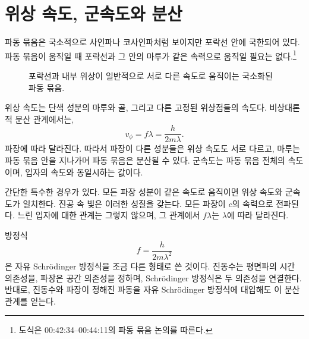 \section{위상 속도, 군속도와 분산}

\begin{classroomqa}\end{classroomqa}

파동 묶음은 국소적으로 사인파나 코사인파처럼 보이지만 포락선 안에 국한되어 있다. 파동 묶음이 움직일 때 포락선과 그 안의 마루가 같은 속력으로 움직일 필요는 없다.\footnote{도식은 00:42:34--00:44:11의 파동 묶음 논의를 따른다.}

\begin{figure}[t]\centering
{}\caption{포락선과 내부 위상이 일반적으로 서로 다른 속도로 움직이는 국소화된 파동 묶음.}\end{figure}

위상 속도는 단색 성분의 마루와 골, 그리고 다른 고정된 위상점들의 속도다. 비상대론적 분산 관계에서는, \begin{equation}
v_\phi=f\lambda=\frac{h}{2m\lambda}.
\end{equation}파장에 따라 달라진다. 따라서 파장이 다른 성분들은 위상 속도도 서로 다르고, 마루는 파동 묶음 안을 지나가며 파동 묶음은 분산될 수 있다. 군속도는 파동 묶음 전체의 속도이며, 입자의 속도와 동일시하는 값이다.

간단한 특수한 경우가 있다. 모든 파장 성분이 같은 속도로 움직이면 위상 속도와 군속도가 일치한다. 진공 속 빛은 이러한 성질을 갖는다. 모든 파장이 \(c\)의 속력으로 전파된다. 느린 입자에 대한 관계는 그렇지 않으며, 그 관계에서 \(f\lambda\)는 \(\lambda\)에 따라 달라진다.

방정식 \begin{equation}
f=\frac{h}{2m\lambda^2}
\end{equation}은 자유 Schr\"odinger 방정식을 조금 다른 형태로 쓴 것이다. 진동수는 평면파의 시간 의존성을, 파장은 공간 의존성을 정하며, Schr\"odinger 방정식은 두 의존성을 연결한다. 반대로, 진동수와 파장이 정해진 파동을 자유 Schr\"odinger 방정식에 대입해도 이 분산 관계를 얻는다.

